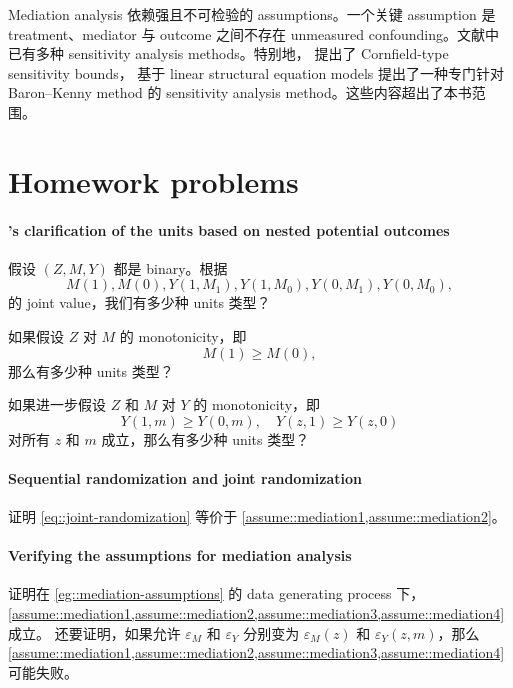 Mediation analysis 依赖强且不可检验的 assumptions。一个关键 assumption 是 treatment、mediator 与 outcome 之间不存在 unmeasured confounding。文献中已有多种 sensitivity analysis methods。特别地，\citet{ding2016sharp} 提出了 Cornfield-type sensitivity bounds，\citet{zhang2022interpretable} 基于 linear structural equation models 提出了一种专门针对 Baron--Kenny method 的 sensitivity analysis method。这些内容超出了本书范围。





 

\section{Homework problems}\label{chapter::mediation-problmes}



\paragraph{\citet{Robins::1992}'s clarification of the units based on nested potential outcomes}\label{hw::robins1992-latentgroups}


假设 $(Z,M,Y)$ 都是 binary。根据
$$
M(1), M(0),  Y(1, M_1), Y(1, M_0), Y(0, M_1), Y(0, M_0) ,
$$
的 joint value，我们有多少种 units 类型？

如果假设 $Z$ 对 $M$ 的 monotonicity，即
$$
M(1) \geq  M(0),
$$
那么有多少种 units 类型？

如果进一步假设 $Z$ 和 $M$ 对 $Y$ 的 monotonicity，即
$$
Y(1, m) \geq Y(0, m),  \quad Y(z, 1) \geq Y(z, 0)
$$
对所有 $z$ 和 $m$ 成立，那么有多少种 units 类型？


\paragraph{Sequential randomization and joint randomization}\label{para::sr-jr}

证明 \cref{eq::joint-randomization} 等价于 \cref{assume::mediation1,assume::mediation2}。


\paragraph{Verifying the assumptions for mediation analysis}\label{para::mediation-assumptions-DGP}

证明在 \cref{eg::mediation-assumptions} 的 data generating process 下，\cref{assume::mediation1,assume::mediation2,assume::mediation3,assume::mediation4} 成立。
还要证明，如果允许 $\varepsilon_M$ 和 $\varepsilon_Y$ 分别变为 $\varepsilon_M(z)$ 和 $\varepsilon_Y(z,m)$，那么 \cref{assume::mediation1,assume::mediation2,assume::mediation3,assume::mediation4} 可能失败。
 
